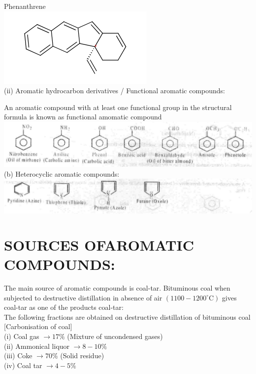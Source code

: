 \documentclass[10pt]{article}
\begin{document}
Phenanthrene\\
\includegraphics{smile-85565562faebe9bc306c5466d387fadbdc718e6b}\\
(ii) Aromatic hydrocarbon derivatives / Functional aromatic compounds:

An aromatic compound with at least one functional group in the structural formula is known as functional amomatic compound\\
\includegraphics[max width=\textwidth, center]{2025_01_28_8470952b98110cec3aabg-202(3)}\\
(b) Heterocyclic aromatic compounds:\\
\includegraphics[max width=\textwidth, center]{2025_01_28_8470952b98110cec3aabg-202(2)}

\section*{SOURCES OFAROMATIC COMPOUNDS:}
The main source of aromatic compounds is coal-tar. Bituminous coal when subjected to destructive distillation in absence of air $\left(1100-1200^{\circ} \mathrm{C}\right)$ gives coal-tar as one of the products coal-tar:\\[0pt]
The following fractions are obtained on destructive distillation of bituminous coal [Carbonisation of coal]\\
(i) Coal gas $\longrightarrow 17 \%$ (Mixture of uncondensed gases)\\
(ii) Ammonical liquor $\longrightarrow 8-10 \%$\\
(iii) Coke $\longrightarrow 70 \%$ (Solid residue)\\
(iv) Coal tar $\longrightarrow 4-5 \%$
\end{document}
